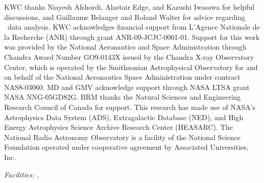 \documentclass[referee,traditabstract]{aa}
\begin{document}
\begin{acknowledgements}
  KWC thanks Niayesh Afshordi, Alastair Edge, and Kazushi Iwasawa for
  helpful discussions, and Guillaume Belanger and Roland Walter for
  advice regarding \integral\ data analysis.  KWC acknowledges
  financial support from L'Agence Nationale de la Recherche (ANR)
  through grant ANR-09-JCJC-0001-01. Support for this work was
  provided by the National Aeronautics and Space Administration
  through Chandra Award Number GO9-0143X issued by the Chandra X-ray
  Observatory Center, which is operated by the Smithsonian
  Astrophysical Observatory for and on behalf of the National
  Aeronautics Space Administration under contract NAS8-03060. MD and
  GMV acknowledge support through NASA LTSA grant NASA
  NNG-05GD82G. BRM thanks the Natural Sciences and Engineering
  Research Council of Canada for support. This research has made use
  of NASA's Astrophysics Data System (ADS), Extragalactic Database
  (NED), and High Energy Astrophysics Science Archive Research Center
  (HEASARC). The National Radio Astronomy Observatory is a facility of
  the National Science Foundation operated under cooperative agreement
  by Associated Universities, Inc.
\end{acknowledgements}


{\it Facilities:} , 






\clearpage
\onecolumn







\label{lastpage}
\end{document}
